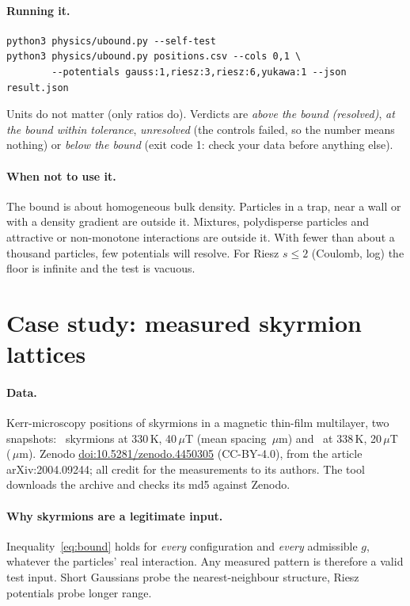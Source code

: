 \documentclass[11pt,a4paper]{article}
\begin{document}
\paragraph{Running it.}
\begin{verbatim}
python3 physics/ubound.py --self-test
python3 physics/ubound.py positions.csv --cols 0,1 \
        --potentials gauss:1,riesz:3,riesz:6,yukawa:1 --json result.json
\end{verbatim}
Units do not matter (only ratios do). Verdicts are \emph{above the bound (resolved)}, \emph{at the bound within
tolerance}, \emph{unresolved} (the controls failed, so the number means nothing) or \emph{below the bound}
(exit code 1: check your data before anything else).

\paragraph{When not to use it.} The bound is about homogeneous bulk density. Particles in a trap, near a wall or with a
density gradient are outside it. Mixtures, polydisperse particles and attractive or non-monotone interactions are
outside it. With fewer than about a thousand particles, few potentials will resolve. For Riesz $s\le2$ (Coulomb, log) the
floor is infinite and the test is vacuous.

\section{Case study: measured skyrmion lattices}\label{sec:case}

\paragraph{Data.} Kerr-microscopy positions of skyrmions in a magnetic thin-film multilayer, two snapshots:
\NA\ skyrmions at 330\,K, 40\,$\mu$T (mean spacing \SpacingA\,$\mu$m) and \NB\ at 338\,K, 20\,$\mu$T
(\SpacingB\,$\mu$m). Zenodo \href{https://doi.org/10.5281/zenodo.4450305}{doi:10.5281/zenodo.4450305} (CC-BY-4.0),
from the article arXiv:2004.09244; all credit for the measurements to its authors. The tool downloads the archive and
checks its md5 against Zenodo.

\paragraph{Why skyrmions are a legitimate input.} Inequality~\eqref{eq:bound} holds for \emph{every} configuration and
\emph{every} admissible $g$, whatever the particles' real interaction. Any measured pattern is therefore a valid test
input. Short Gaussians probe the nearest-neighbour structure, Riesz potentials probe longer range.
\end{document}

